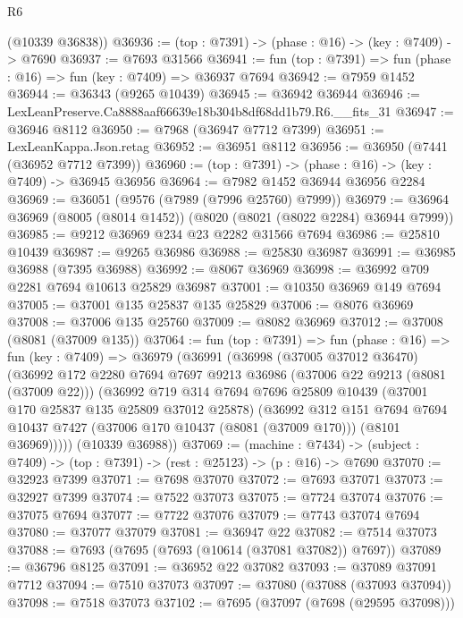 \begin{lexlean}{R6}
\begin{coremodule}
      (@10339 @36838))
@36936 := (top : @7391) -> (phase : @16) -> (key : @7409) -> @7690
@36937 := @7693 @31566
@36941 := fun (top : @7391) => fun (phase : @16) => fun (key : @7409) => @36937 @7694
@36942 := @7959 @1452
@36944 := @36343 (@9265 @10439)
@36945 := @36942 @36944
@36946 := LexLeanPreserve.Ca8888aaf66639e18b304b8df68dd1b79.R6.__fits_31
@36947 := @36946 @8112
@36950 := @7968 (@36947 @7712 @7399)
@36951 := LexLeanKappa.Json.retag
@36952 := @36951 @8112
@36956 := @36950 (@7441 (@36952 @7712 @7399))
@36960 := (top : @7391) -> (phase : @16) -> (key : @7409) -> @36945 @36956
@36964 := @7982 @1452 @36944 @36956 @2284
@36969 := @36051 (@9576 (@7989 (@7996 @25760) @7999))
@36979 := @36964 @36969 (@8005 (@8014 @1452)) (@8020 (@8021 (@8022 @2284) @36944 @7999))
@36985 := @9212 @36969 @234 @23 @2282 @31566 @7694
@36986 := @25810 @10439
@36987 := @9265 @36986
@36988 := @25830 @36987
@36991 := @36985 @36988 (@7395 @36988)
@36992 := @8067 @36969
@36998 := @36992 @709 @2281 @7694 @10613 @25829 @36987
@37001 := @10350 @36969 @149 @7694
@37005 := @37001 @135 @25837 @135 @25829
@37006 := @8076 @36969
@37008 := @37006 @135 @25760
@37009 := @8082 @36969
@37012 := @37008 (@8081 (@37009 @135))
@37064 := fun (top : @7391) =>
  fun (phase : @16) =>
  fun (key : @7409) =>
  @36979
    (@36991
      (@36998
        (@37005 @37012 @36470)
        (@36992
          @172
          @2280
          @7694
          @7697
          @9213
          @36986
          (@37006 @22 @9213 (@8081 (@37009 @22)))
          (@36992
            @719
            @314
            @7694
            @7696
            @25809
            @10439
            (@37001 @170 @25837 @135 @25809 @37012 @25878)
            (@36992
              @312
              @151
              @7694
              @7694
              @10437
              @7427
              (@37006 @170 @10437 (@8081 (@37009 @170)))
              (@8101 @36969)))))
      (@10339 @36988))
@37069 := (machine : @7434) ->
  (subject : @7409) -> (top : @7391) -> (rest : @25123) -> (p : @16) -> @7690
@37070 := @32923 @7399
@37071 := @7698 @37070
@37072 := @7693 @37071
@37073 := @32927 @7399
@37074 := @7522 @37073
@37075 := @7724 @37074
@37076 := @37075 @7694
@37077 := @7722 @37076
@37079 := @7743 @37074 @7694
@37080 := @37077 @37079
@37081 := @36947 @22
@37082 := @7514 @37073
@37088 := @7693 (@7695 (@7693 (@10614 (@37081 @37082)) @7697))
@37089 := @36796 @8125
@37091 := @36952 @22 @37082
@37093 := @37089 @37091 @7712
@37094 := @7510 @37073
@37097 := @37080 (@37088 (@37093 @37094))
@37098 := @7518 @37073
@37102 := @7695 (@37097 (@7698 (@29595 @37098)))

\end{coremodule}
\end{lexlean}
